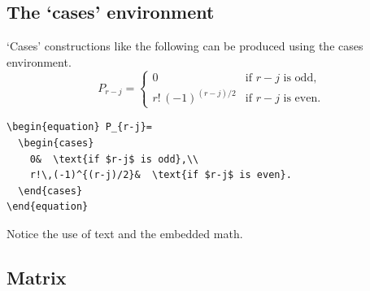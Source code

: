 \documentclass[manuscript, printscheme]{aomart}
\newcommand{\ntt}{\normalfont\ttfamily}
\newcommand{\cn}[1]{{\protect\ntt\bslash#1}}
\newcommand{\env}[1]{{\protect\ntt#1}}
\newtheorem[{}\it]{thm}{Theorem}[section]
\theoremstyle{definition}
\newtheorem*[{}\it]{notation}{Notation}
\begin{document}
\subsection{The `cases' environment}
`Cases' constructions like the following can be produced using
the \env{cases} environment.
\begin{equation}
P_{r-j}=
  \begin{cases}
    0&  \text{if $r-j$ is odd},\\
    r!\,(-1)^{(r-j)/2}&  \text{if $r-j$ is even}.
  \end{cases}
\end{equation}
\begin{verbatim}
\begin{equation} P_{r-j}=
  \begin{cases}
    0&  \text{if $r-j$ is odd},\\
    r!\,(-1)^{(r-j)/2}&  \text{if $r-j$ is even}.
  \end{cases}
\end{equation}
\end{verbatim}
Notice the use of \cn{text} and the embedded math.

\subsection{Matrix}
\end{document}
